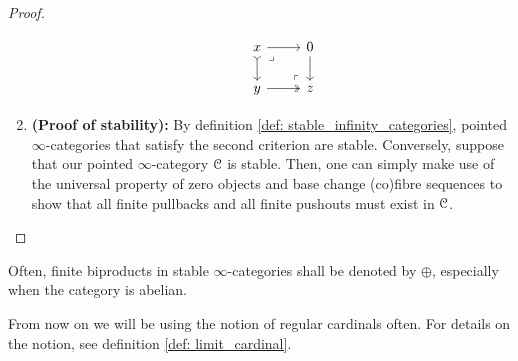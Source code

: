 \begin{proof}
\begin{enumerate}
\begin{enumerate}
                                $$
                                    \begin{tikzcd}
                                        x & 0 \\
                                        y & z
                                        \arrow[from=1-2, to=2-2]
                                        \arrow[two heads, from=2-1, to=2-2]
                                        \arrow[tail, from=1-1, to=2-1]
                                        \arrow[from=1-1, to=1-2]
                                        \arrow["\lrcorner"{anchor=center, pos=0.125}, draw=none, from=1-1, to=2-2]
                                        \arrow["\lrcorner"{anchor=center, pos=0.125, rotate=180}, draw=none, from=2-2, to=1-1]
                                    \end{tikzcd}
                                $$
                        \end{enumerate}
                    \item \textbf{(Proof of stability):} By definition \ref{def: stable_infinity_categories}, pointed $\infty$-categories that satisfy the second criterion are stable. Conversely, suppose that our pointed $\infty$-category $\mathcal{C}$ is stable. Then, one can simply make use of the universal property of zero objects and base change (co)fibre sequences to show that all finite pullbacks and all finite pushouts must exist in $\mathcal{C}$. 
                \end{enumerate}
            \end{proof}
        \begin{convention}
            Often, finite biproducts in stable $\infty$-categories shall be denoted by $\oplus$, especially when the category is abelian.
        \end{convention}  
        
        \begin{remark}
            From now on we will be using the notion of regular cardinals often. For details on the notion, see definition \ref{def: limit_cardinal}.
        \end{remark}
        
